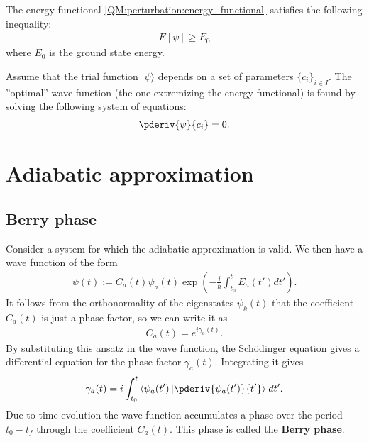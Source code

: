 
    \begin{property}
        The energy functional \ref{QM:perturbation:energy_functional} satisfies the following inequality:
        \begin{gather}
            E[\psi] \geq E_0
        \end{gather}
        where $E_0$ is the ground state energy.
    \end{property}

    \begin{method}
        Assume that the trial function $|\psi\rangle$ depends on a set of parameters $\{c_i\}_{i\in I}$. The ''optimal'' wave function (the one extremizing the energy functional) is found by solving the following system of equations:
        \begin{gather}
            \pderiv{\psi}{c_i} = 0.
        \end{gather}
    \end{method}

\section{Adiabatic approximation}
\subsection{Berry phase}

    Consider a system for which the adiabatic approximation is valid. We then have a wave function of the form
    \begin{gather}
        \psi(t) := C_a(t)\psi_a(t)\exp\left(-\frac{i}{\hbar}\int_{t_0}^tE_a(t')dt'\right).
    \end{gather}
    It follows from the orthonormality of the eigenstates $\psi_k(t)$ that the coefficient $C_a(t)$ is just a phase factor, so we can write it as
    \begin{gather}
        C_a(t) = e^{i\gamma_a(t)}.
    \end{gather}
    By substituting this ansatz in the wave function, the Sch\"odinger equation gives a differential equation for the phase factor $\gamma_a(t)$. Integrating it gives
    \begin{gather}
        \label{QM:perturbation:berry:phase_factor}
        \gamma_a(t) = i\int_{t_0}^t\left\langle\psi_a(t')\left|\pderiv{\psi_a(t')}{t'}\right\rangle\right. dt'.
    \end{gather}
    Due to time evolution the wave function accumulates a phase over the period $t_0-t_f$ through the coefficient $C_a(t)$. This phase is called the \textbf{Berry phase}.

